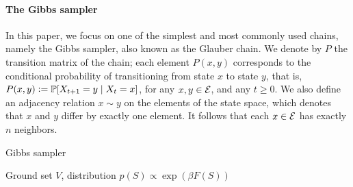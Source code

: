 %

\paragraph{The Gibbs sampler}
In this paper, we focus on one of the simplest and most commonly used chains, namely the Gibbs sampler, also known as the Glauber chain.
We denote by $P$ the transition matrix of the chain; each element $P(x, y)$ corresponds to the conditional probability of transitioning from state $x$ to state $y$, that is, $P(x, y) \defeq \P[X_{t+1} = y \mid X_{t} = x]$, for any $x, y \in \ss$, and any $t \geq 0$.
We also define an adjacency relation $x \sim y$ on the elements of the state space, which denotes that $x$ and $y$ differ by exactly one element.
It follows that each $x \in \ss$ has exactly $n$ neighbors.

\begin{algorithm}[tb]
	\caption{Gibbs sampler}
	\label{alg:gibbs}
	\small{
		\begin{algorithmic}[1]
			\REQUIRE Ground set $V$, distribution $p(S) \propto \exp(\beta F(S))$
			\ENDFOR
		\end{algorithmic}
	}
\end{algorithm}

